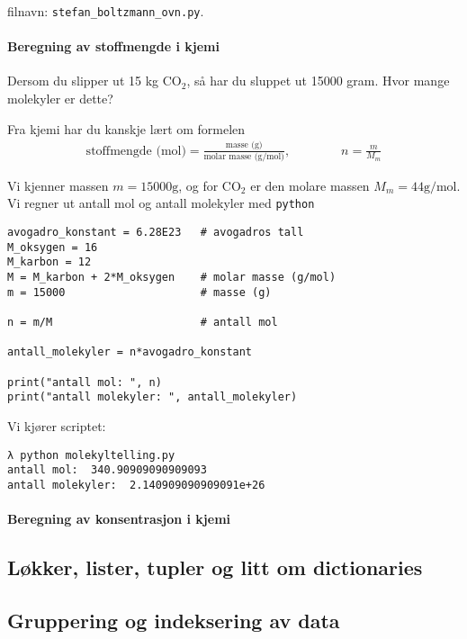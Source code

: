 \documentclass[]{article}
\let\oldparagraph\paragraph
\renewcommand{\paragraph}[1]{\oldparagraph{#1}\mbox{}}
\begin{document}
filnavn: \texttt{stefan\_boltzmann\_ovn.py}.

\paragraph{Beregning av stoffmengde i
kjemi}\label{beregning-av-stoffmengde-i-kjemi}

Dersom du slipper ut 15 kg \(\text{CO}_2\), så har du sluppet ut 15000
gram. Hvor mange molekyler er dette?

Fra kjemi har du kanskje lært om formelen \[
\begin{align}
\text{stoffmengde (mol)} = \frac{\text{masse (g)}}{\text{molar masse (g/mol)}},
& & & & &
n = \frac{m}{M_m}
\end{align}
\]

Vi kjenner massen \(m=15000\text{g}\), og for \(\text{CO}_2\) er den
molare massen \(M_m = 44\text{g}/\text{mol}\). Vi regner ut antall mol
og antall molekyler med \texttt{python}

\begin{verbatim}
avogadro_konstant = 6.28E23   # avogadros tall
M_oksygen = 16
M_karbon = 12
M = M_karbon + 2*M_oksygen    # molar masse (g/mol)
m = 15000                     # masse (g)

n = m/M                       # antall mol

antall_molekyler = n*avogadro_konstant

print("antall mol: ", n)
print("antall molekyler: ", antall_molekyler)
\end{verbatim}

Vi kjører scriptet:

\begin{verbatim}
λ python molekyltelling.py
antall mol:  340.90909090909093
antall molekyler:  2.140909090909091e+26
\end{verbatim}

\paragraph{Beregning av konsentrasjon i
kjemi}\label{beregning-av-konsentrasjon-i-kjemi}

\subsection{Løkker, lister, tupler og litt om
dictionaries}\label{luxf8kker-lister-tupler-og-litt-om-dictionaries}

\subsection{Gruppering og indeksering av
data}\label{gruppering-og-indeksering-av-data}
\end{document}
